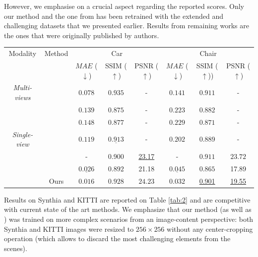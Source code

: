 However, we emphasise on a crucial aspect regarding the reported scores. Only our method and the one from \citep{kim2020novel} has been retrained with the extended and challenging datasets that we presented earlier. Results from remaining works \citep{tatarchenko2015single,zhou2016view,park2017transformation,sun2018multiview,} are the ones that were originally published by authors. 
\begin{table}[htp!]
\begin{center}
\begin{adjustbox}{max width=\textwidth}
\begin{tabular}[h]{c||ccccccc}
\hline
Modality & Method & \multicolumn{3}{c}{Car} & \multicolumn{3}{c}{Chair} \\
 & & $MAE$ ($\downarrow$) & SSIM ($\uparrow$) & PSNR ($\uparrow$) & $MAE$ ($\downarrow$) & SSIM ($\uparrow$)) & PSNR ($\uparrow$) \\
\hline
\textit{Multi-views} &\citep{sun2018multiview} & $0.078$ & ${0.935}$ & - & $0.141$ & ${0.911}$ & -\\
\hline
& \citep{tatarchenko2015single} & $0.139$ & $0.875$ & - & $0.223$ & $0.882$ & -\\
&\citep{zhou2016view} & $0.148$ & $0.877$ & - & $0.229$ & $0.871$ & - \\
\textit{Single-view} &\citep{park2017transformation} & $0.119$ & $\underline{0.913}$ & - & $0.202$ & 0.889& -\\
& \citep{yu2021pixelnerf} & - & 0.900 & \underline{23.17} & - & $\mathbf{0.911}$ & $\mathbf{23.72}$ \\
&\citep{kim2020novel} & $\underline{0.026}$ & $0.892$ & 21.18 & $\underline{0.045}$ & $0.865$ & 17.89\\
& Ours & $\mathbf{0.016}$ & $\mathbf{0.928}$ & $\mathbf{24.23}$ & $\mathbf{0.032}$ & \underline{0.901}& \underline{19.55}\\
\hline \hline

\end{tabular}
\end{adjustbox}
\end{center}
\label{tab:1}
\end{table}

 Results on Synthia\citep{ros2016synthia} and KITTI \citep{geiger2012we} are reported on Table \ref{tab:2} and are competitive with current state of the art methods. We emphasize that our method (as well as \citep{kim2020novel}) was trained on more complex scenarios from an image-content perspective: both Synthia and KITTI images were resized to $256\times 256$ without any center-cropping operation (which allows to discard the most challenging elements from the scenes). 

